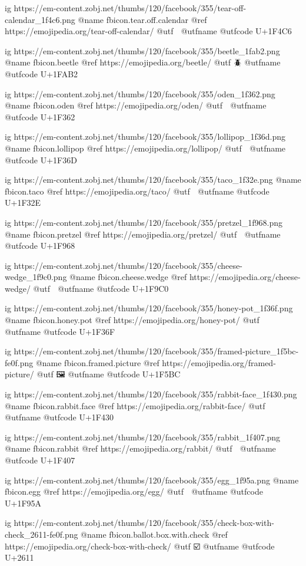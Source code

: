 	ig https://em-content.zobj.net/thumbs/120/facebook/355/tear-off-calendar_1f4c6.png
	@name fbicon.tear.off.calendar
	@ref https://emojipedia.org/tear-off-calendar/
	@utf 📆
	@utfname
	@utfcode U+1F4C6

	ig https://em-content.zobj.net/thumbs/120/facebook/355/beetle_1fab2.png
	@name fbicon.beetle
	@ref https://emojipedia.org/beetle/
	@utf 🪲
	@utfname
	@utfcode U+1FAB2

	ig https://em-content.zobj.net/thumbs/120/facebook/355/oden_1f362.png
	@name fbicon.oden
	@ref https://emojipedia.org/oden/
	@utf 🍢
	@utfname
	@utfcode U+1F362

	ig https://em-content.zobj.net/thumbs/120/facebook/355/lollipop_1f36d.png
	@name fbicon.lollipop
	@ref https://emojipedia.org/lollipop/
	@utf 🍭
	@utfname
	@utfcode U+1F36D

	ig https://em-content.zobj.net/thumbs/120/facebook/355/taco_1f32e.png
	@name fbicon.taco
	@ref https://emojipedia.org/taco/
	@utf 🌮
	@utfname
	@utfcode U+1F32E

	ig https://em-content.zobj.net/thumbs/120/facebook/355/pretzel_1f968.png
	@name fbicon.pretzel
	@ref https://emojipedia.org/pretzel/
	@utf 🥨
	@utfname
	@utfcode U+1F968

	ig https://em-content.zobj.net/thumbs/120/facebook/355/cheese-wedge_1f9c0.png
	@name fbicon.cheese.wedge
	@ref https://emojipedia.org/cheese-wedge/
	@utf 🧀
	@utfname
	@utfcode U+1F9C0

	ig https://em-content.zobj.net/thumbs/120/facebook/355/honey-pot_1f36f.png
	@name fbicon.honey.pot
	@ref https://emojipedia.org/honey-pot/
	@utf 🍯
	@utfname
	@utfcode U+1F36F

	ig https://em-content.zobj.net/thumbs/120/facebook/355/framed-picture_1f5bc-fe0f.png
	@name fbicon.framed.picture
	@ref https://emojipedia.org/framed-picture/
	@utf 🖼
	@utfname
	@utfcode U+1F5BC

	ig https://em-content.zobj.net/thumbs/120/facebook/355/rabbit-face_1f430.png
	@name fbicon.rabbit.face
	@ref https://emojipedia.org/rabbit-face/
	@utf 🐰
	@utfname
	@utfcode U+1F430

	ig https://em-content.zobj.net/thumbs/120/facebook/355/rabbit_1f407.png
	@name fbicon.rabbit
	@ref https://emojipedia.org/rabbit/
	@utf 🐇
	@utfname
	@utfcode U+1F407

	ig https://em-content.zobj.net/thumbs/120/facebook/355/egg_1f95a.png
	@name fbicon.egg
	@ref https://emojipedia.org/egg/
	@utf 🥚
	@utfname
	@utfcode U+1F95A

	ig https://em-content.zobj.net/thumbs/120/facebook/355/check-box-with-check_2611-fe0f.png
	@name fbicon.ballot.box.with.check
	@ref https://emojipedia.org/check-box-with-check/
	@utf ☑️
	@utfname
	@utfcode U+2611

